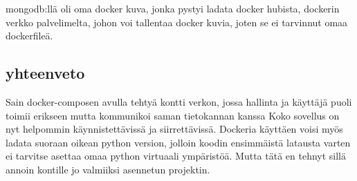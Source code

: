 mongodb:llä oli oma docker kuva, jonka pystyi ladata docker hubista, dockerin verkko palvelimelta, johon voi tallentaa docker kuvia, joten se ei tarvinnut omaa dockerfileä.
\medskip


\subsection*{yhteenveto}

Sain docker-composen avulla tehtyä kontti verkon, jossa hallinta ja käyttäjä puoli toimii erikseen mutta kommunikoi saman tietokannan kanssa 
Koko sovellus on nyt helpommin käynnistettävissä ja siirrettävissä.
Dockeria käyttäen voisi myös ladata suoraan oikean python version, jolloin koodin ensimmäistä latausta varten ei tarvitse asettaa omaa python virtuaali ympäristöä. 
Mutta tätä en tehnyt sillä annoin kontille jo valmiiksi asennetun projektin.
